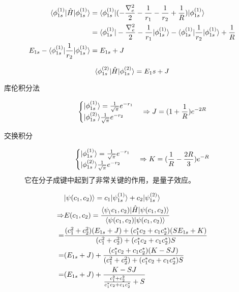 \begin{align*}
\langle \phi_{1s}^{(1)} | \hat{H} | \phi_{1s}^{(1)} \rangle&=\langle \phi_{1s}^{(1)} | (-\frac{\nabla_e^2}{2}-\frac{1}{r_1}-\frac{1}{r_2}+\frac{1}{R}) | \phi_{1s}^{(1)} \rangle\\
&=\langle \phi_{1s}^{(1)} | -\frac{\nabla^2_e}{2}-\frac{1}{r_1} | \phi_{1s}^{(1)} \rangle-\langle \phi_{1s}^{(1)} | \frac{1}{r_2} | \phi_{1s}^{(1)} \rangle+\frac{1}{R}\\
E_{1s}-\langle \phi_{1s}^{(1)} | \frac{1}{r_2} | \phi_{1s}^{(1)} \rangle
&=E_{1s}+J
\end{align*}


\begin{equation*}
\langle \phi_{1s}^{(2)} | \hat{H} | \phi_{1s}^{(2)} \rangle=E_1s+J
\end{equation*}

\begin{description}
	\item[库伦积分法]
	\begin{equation}
	\begin{cases}
	| \phi_{1s}^{(1)} \rangle=\frac{1}{\sqrt{\pi}}e^{-r_1}\\
	| \phi_{1s}^{(2)} \rangle\frac{1}{\sqrt{\pi}}e^{-r_2}
	\end{cases}
	\Rightarrow J=(1+\frac{1}{R})e^{-2R}
	\end{equation}

	\item[交换积分]
	\begin{equation}
	\begin{cases}
	| \phi_{1s}^{(1)} \rangle=\frac{1}{\sqrt{\pi}}e^{-r_1}\\
	| \phi_{1s}^{(2)} \rangle\frac{1}{\sqrt{\pi}}e^{-r_2}
	\end{cases}
	\Rightarrow K=(\frac{1}{R}-\frac{2R}{3})e^{-R}
	\end{equation}
	它在分子成键中起到了非常关键的作用，是量子效应。
\end{description}

\begin{align*}
& | \psi(c_1,c_2) \rangle = c_1| \psi_{1s}^{(1)} \rangle + c_2 | \psi_{1s}^{(2)} \rangle\\
\Rightarrow & E(c_1,c_2)= \frac{\langle \psi_(c_1,c_2) | \hat{H} | \psi(c_1,c_2) \rangle}{\langle \psi(c_1,c_2) | \psi(c_1,c_2) \rangle}\\
=&\frac{(c_1^2+c_2^2)(E_{1s}+J)+(c_1^*c_2+c_1c_2^*)(SE_{1s}+K)}{(c_1^2+c_2^2)+(c_1^*c_2+c_1c_2^*)S}\\
=& (E_{1s}+J)+\frac{(c_1^*c_2+c_1c_2^*)(K-SJ)}{(c_1^2+c_2^2)+(c_1^*c_2+c_1c_2^*)S}\\
=&(E_{1s}+J)+\frac{K-SJ}{\frac{c_1^2+c_2^2}{c_1^*c_2+c_1c_2^*}+S}
\end{align*}

